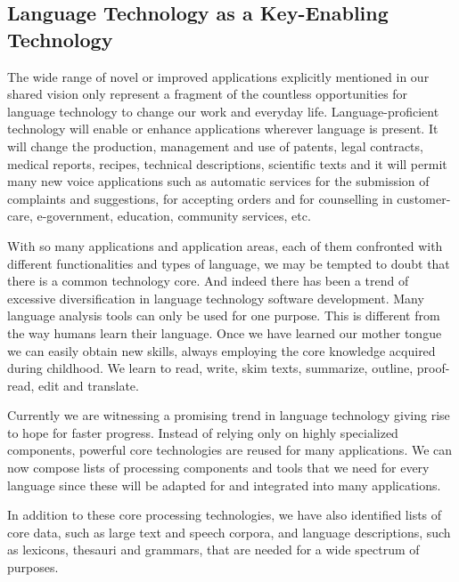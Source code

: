 \begin{multicols}{2}
\subsection{Language Technology as a Key-Enabling Technology }
\label{sec:lang-techn-as-key-enabling-technology}

The wide range of novel or improved applications explicitly mentioned in our shared vision only represent a fragment of the countless opportunities for language technology to change our work and everyday life. Language-proficient technology will enable or enhance applications wherever language is present. It will change the production, management and use of patents, legal contracts, medical reports, recipes, technical descriptions, scientific texts and it will permit many new voice applications such as automatic services for the submission of complaints and suggestions, for accepting orders and for counselling in customer-care, e-government, education, community services, etc.   

With so many applications and application areas, each of them confronted with different functionalities and types of language, we may be tempted to doubt that there is a common technology core. And indeed there has been a trend of excessive diversification in language technology software development. Many language analysis tools can only be used for one purpose. This is different from the way humans learn their language. Once we have learned our mother tongue we can easily obtain new skills, always employing the core knowledge acquired during childhood. We learn to read, write, skim texts, summarize, outline, proof-read, edit and translate.
 
Currently we are witnessing a promising trend in language technology giving rise to hope for faster progress. Instead of relying only on highly specialized components, powerful core technologies are reused for many applications. We can now compose lists of processing components and tools that we need for every language since these will be adapted for and integrated into many applications.
 
In addition to these core processing technologies, we have also identified lists of core data, such as large text and speech corpora, and language descriptions, such as lexicons, thesauri and grammars, that are needed for a wide spectrum of purposes.
 

\end{multicols}
